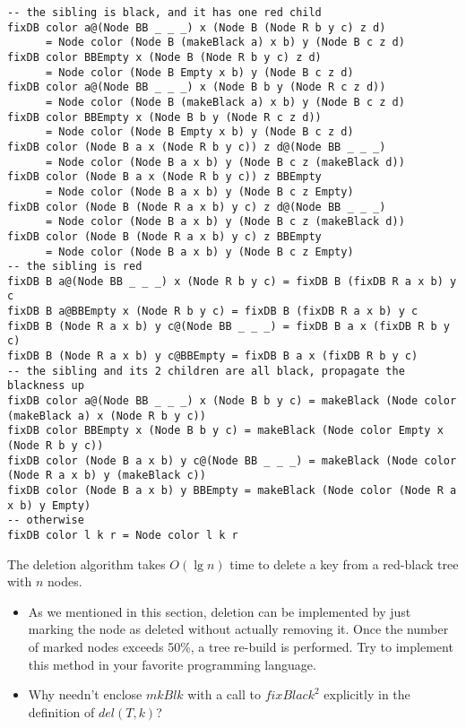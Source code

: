 \documentclass[b5paper]{article}
\begin{document}
\begin{lstlisting}
-- the sibling is black, and it has one red child
fixDB color a@(Node BB _ _ _) x (Node B (Node R b y c) z d)
      = Node color (Node B (makeBlack a) x b) y (Node B c z d)
fixDB color BBEmpty x (Node B (Node R b y c) z d)
      = Node color (Node B Empty x b) y (Node B c z d)
fixDB color a@(Node BB _ _ _) x (Node B b y (Node R c z d))
      = Node color (Node B (makeBlack a) x b) y (Node B c z d)
fixDB color BBEmpty x (Node B b y (Node R c z d))
      = Node color (Node B Empty x b) y (Node B c z d)
fixDB color (Node B a x (Node R b y c)) z d@(Node BB _ _ _)
      = Node color (Node B a x b) y (Node B c z (makeBlack d))
fixDB color (Node B a x (Node R b y c)) z BBEmpty
      = Node color (Node B a x b) y (Node B c z Empty)
fixDB color (Node B (Node R a x b) y c) z d@(Node BB _ _ _)
      = Node color (Node B a x b) y (Node B c z (makeBlack d))
fixDB color (Node B (Node R a x b) y c) z BBEmpty
      = Node color (Node B a x b) y (Node B c z Empty)
-- the sibling is red
fixDB B a@(Node BB _ _ _) x (Node R b y c) = fixDB B (fixDB R a x b) y c
fixDB B a@BBEmpty x (Node R b y c) = fixDB B (fixDB R a x b) y c
fixDB B (Node R a x b) y c@(Node BB _ _ _) = fixDB B a x (fixDB R b y c)
fixDB B (Node R a x b) y c@BBEmpty = fixDB B a x (fixDB R b y c)
-- the sibling and its 2 children are all black, propagate the blackness up
fixDB color a@(Node BB _ _ _) x (Node B b y c) = makeBlack (Node color (makeBlack a) x (Node R b y c))
fixDB color BBEmpty x (Node B b y c) = makeBlack (Node color Empty x (Node R b y c))
fixDB color (Node B a x b) y c@(Node BB _ _ _) = makeBlack (Node color (Node R a x b) y (makeBlack c))
fixDB color (Node B a x b) y BBEmpty = makeBlack (Node color (Node R a x b) y Empty)
-- otherwise
fixDB color l k r = Node color l k r
\end{lstlisting}

The deletion algorithm takes $O(\lg n)$ time to delete a key from
a red-black tree with $n$ nodes.

\begin{Exercise}

\begin{itemize}
\item As we mentioned in this section, deletion can be implemented
by just marking the node as deleted without actually removing it.
Once the number of marked nodes exceeds 50\%, a tree re-build is performed. Try to implement this
method in your favorite programming language.
\item Why needn't enclose $mkBlk$ with a call to $fixBlack^2$ explicitly in the definition of $del(T, k)$?
\end{itemize}

\end{Exercise}
\end{document}
